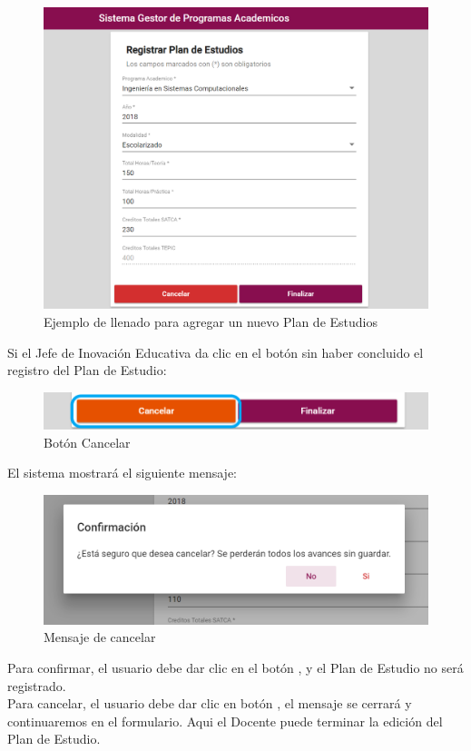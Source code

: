 \begin{figure}[!hbtp]
	\centering
	\hypertarget{ejreg}{\includegraphics[width=0.7\linewidth]{images/SP4-GPE/registrarEjem}}
	\caption{Ejemplo de llenado para agregar un nuevo Plan de Estudios}
	\label{ejreg}
\end{figure}
Si el Jefe de Inovación Educativa da clic en el botón  sin haber concluido el registro del Plan de Estudio:

\begin{figure}[!hbtp]
	\centering
	\hypertarget{cancel2}{\includegraphics[width=0.7\linewidth]{images/SP4-GPE/cancelarPE}}
	\caption{Botón Cancelar}
	\label{cancel2}
\end{figure}
\newpage

El sistema mostrará el siguiente mensaje:
\begin{figure}[!hbtp]
	\centering
	\hypertarget{ms1}{\includegraphics[width=0.7\linewidth]{images/SP4-GPE/m1}}
	\caption{Mensaje de cancelar}
	\label{ms1}
\end{figure}

Para confirmar, el usuario debe dar clic en el botón  , y el Plan de Estudio no será registrado.\\

Para cancelar, el usuario debe dar clic en botón  , el mensaje se cerrará y continuaremos en el formulario. Aqui el Docente puede terminar la edición del Plan de Estudio.

